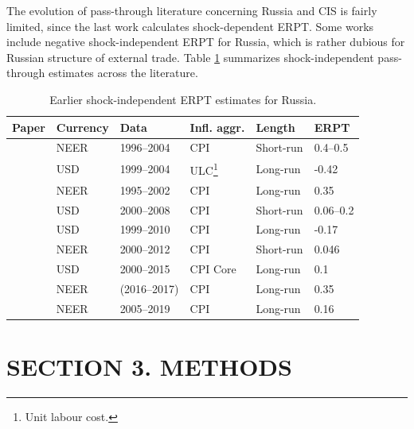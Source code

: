 \documentclass[12pt, a4paper]{extarticle}
\begin{document}
The evolution of pass-through literature concerning Russia and CIS is fairly limited, since the last work calculates shock-dependent ERPT. Some works include negative shock-independent ERPT for Russia, which is rather dubious for Russian structure of external trade. Table \ref{table:litreview_erpt} summarizes shock-independent pass-through estimates across the literature.

\begin{table}[h]
	\centering
	\begin{tabular}{llllll}
		Paper                                   & Currency & Data         & Infl. aggr. & Length    & ERPT \\
		\hline
		\cite{Oomes2005}       & NEER               & 1996--2004   & CPI             & Short-run & 0.4--0.5     \\
		\cite{Korhonen2006} & USD & 1999--2004 & ULC\footnote{Unit labour cost.} & Long-run & -0.42 \\
		\cite{Dobrynskaya2008} & NEER               & 1995--2002   & CPI             & Long-run  & 0.35         \\
		\cite{Kataranova2010}  & USD                & 2000--2008   & CPI             & Short-run & 0.06--0.2    \\
		\cite{Beckmann2013}    & USD                & 1999--2010   & CPI             & Long-run  & -0.17        \\
		\cite{Ponomarev2016}   & NEER               & 2000--2012   & CPI             & Short-run & 0.046        \\
		\cite{Faryna2016}      & USD                & 2000--2015   & CPI Core        & Long-run  & 0.1          \\
		\cite{Sinyakov2019}    & NEER               & (2016--2017) & CPI             & Long-run  & 0.35         \\
		\cite{Khotulev2020}    & NEER               & 2005--2019   & CPI             & Long-run  & 0.16        \\
		\hline 
	\end{tabular}
	\caption{Earlier shock-independent ERPT estimates for Russia.}
	\label{table:litreview_erpt}
\end{table}

\clearpage
\section*{SECTION 3. METHODS}
\setcounter{section}{3}
\end{document}
